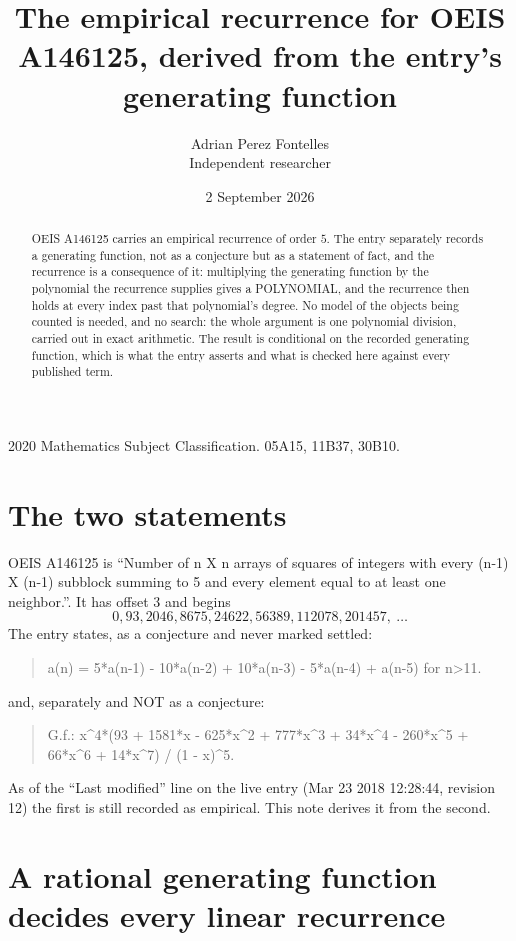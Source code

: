 \documentclass[11pt,a4paper]{article}
\title{The empirical recurrence for OEIS A146125, derived from the entry's generating function}
\author{Adrian Perez Fontelles\\ \small Independent researcher}
\date{2 September 2026}
\theoremstyle{plain}
\theoremstyle{definition}
\begin{document}
\maketitle

\begin{abstract}
OEIS A146125 carries an empirical recurrence of order $5$. The entry separately records a
generating function, not as a conjecture but as a statement of fact, and the recurrence is a
consequence of it: multiplying the generating function by the polynomial the recurrence
supplies gives a POLYNOMIAL, and the recurrence then holds at every index past that
polynomial's degree. No model of the objects being counted is needed, and no search: the
whole argument is one polynomial division, carried out in exact arithmetic. The result is
conditional on the recorded generating function, which is what the entry asserts and what is
checked here against every published term.
\end{abstract}

\noindent\small 2020 Mathematics Subject Classification. 05A15, 11B37, 30B10.\normalsize

\section{The two statements}

OEIS A146125 is ``Number of n X n arrays of squares of integers with every (n-1) X (n-1) subblock summing to 5 and every element equal to at least one neighbor.''. It has offset $3$ and begins
\[
0, 93, 2046, 8675, 24622, 56389, 112078, 201457,\ \dots
\]
The entry states, as a conjecture and never marked settled:
\begin{quote}
a(n) = 5*a(n-1) - 10*a(n-2) + 10*a(n-3) - 5*a(n-4) + a(n-5) for n>11.
\end{quote}
and, separately and NOT as a conjecture:
\begin{quote}
G.f.: x\^{}4*(93 + 1581*x - 625*x\^{}2 + 777*x\^{}3 + 34*x\^{}4 - 260*x\^{}5 + 66*x\^{}6 + 14*x\^{}7) / (1 - x)\^{}5.
\end{quote}
As of the ``Last modified'' line on the live entry (Mar 23 2018 12:28:44, revision 12) the first is still
recorded as empirical. This note derives it from the second.

\section{A rational generating function decides every linear recurrence}
\end{document}
